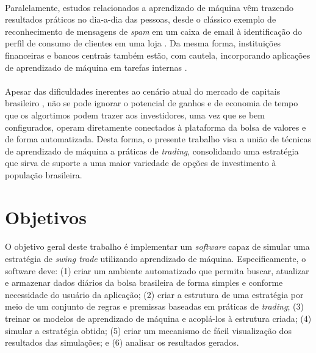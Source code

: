 \paragraph{} Paralelamente, estudos relacionados a aprendizado de máquina vêm trazendo resultados práticos no dia-a-dia das pessoas, desde o clássico exemplo de reconhecimento de mensagens de \textit{spam} em um caixa de email \cite{crawford2015survey} à identificação do perfil de consumo de clientes em uma loja \cite{dullaghan2017integration}. Da mesma forma, instituições financeiras e bancos centrais também estão, com cautela, incorporando aplicações de aprendizado de máquina em tarefas internas \cite{fernandez2019artificial}.

\paragraph{} Apesar das dificuldades inerentes ao cenário atual do mercado de capitais brasileiro \cite{ladd1965obstaculos}, não se pode ignorar o potencial de ganhos e de economia de tempo que os algortimos podem trazer aos investidores, uma vez que se bem configurados, operam diretamente conectados à plataforma da bolsa de valores e de forma automatizada. Desta forma, o presente trabalho visa a união de técnicas de aprendizado de máquina a práticas de \textit{trading}, consolidando uma estratégia que sirva de suporte a uma maior variedade de opções de investimento à população brasileira.



\FloatBarrier
\section{Objetivos}

\paragraph{} O objetivo geral deste trabalho é implementar um \textit{software} capaz de simular uma estratégia de \textit{swing trade} utilizando aprendizado de máquina. Especificamente, o software deve: (1) criar um ambiente automatizado que permita buscar, atualizar e armazenar dados diários da bolsa brasileira de forma simples e conforme necessidade do usuário da aplicação; (2) criar a estrutura de uma estratégia por meio de um conjunto de regras e premissas baseadas em práticas de \textit{trading}; (3) treinar os modelos de aprendizado de máquina e acoplá-los à estrutura criada; (4) simular a estratégia obtida; (5) criar um mecanismo de fácil visualização dos resultados das simulações; e (6) analisar os resultados gerados.



